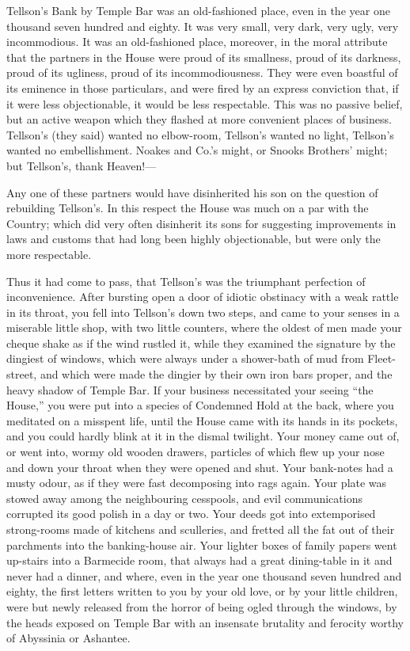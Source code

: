Tellson's Bank by Temple Bar was an old-fashioned place, even in the
year one thousand seven hundred and eighty.  It was very small, very
dark, very ugly, very incommodious.  It was an old-fashioned place,
moreover, in the moral attribute that the partners in the House were
proud of its smallness, proud of its darkness, proud of its ugliness,
proud of its incommodiousness.  They were even boastful of its
eminence in those particulars, and were fired by an express conviction
that, if it were less objectionable, it would be less respectable.
This was no passive belief, but an active weapon which they flashed
at more convenient places of business.  Tellson's (they said) wanted
no elbow-room, Tellson's wanted no light, Tellson's wanted no
embellishment.  Noakes and Co.'s might, or Snooks Brothers' might;
but Tellson's, thank Heaven!---%

Any one of these partners would have disinherited his son on the
question of rebuilding Tellson's.  In this respect the House was much
on a par with the Country; which did very often disinherit its sons
for suggesting improvements in laws and customs that had long been
highly objectionable, but were only the more respectable.

Thus it had come to pass, that Tellson's was the triumphant
perfection of inconvenience.  After bursting open a door of idiotic
obstinacy with a weak rattle in its throat, you fell into Tellson's
down two steps, and came to your senses in a miserable little shop,
with two little counters, where the oldest of men made your cheque
shake as if the wind rustled it, while they examined the signature by
the dingiest of windows, which were always under a shower-bath of mud
from Fleet-street, and which were made the dingier by their own iron
bars proper, and the heavy shadow of Temple Bar.  If your business
necessitated your seeing ``the House,'' you were put into a species of
Condemned Hold at the back, where you meditated on a misspent life,
until the House came with its hands in its pockets, and you could
hardly blink at it in the dismal twilight.  Your money came out of,
or went into, wormy old wooden drawers, particles of which flew up
your nose and down your throat when they were opened and shut.  Your
bank-notes had a musty odour, as if they were fast decomposing into
rags again.  Your plate was stowed away among the neighbouring
cesspools, and evil communications corrupted its good polish in a day
or two.  Your deeds got into extemporised strong-rooms made of
kitchens and sculleries, and fretted all the fat out of their
parchments into the banking-house air.  Your lighter boxes of family
papers went up-stairs into a Barmecide room, that always had a great
dining-table in it and never had a dinner, and where, even in the
year one thousand seven hundred and eighty, the first letters written
to you by your old love, or by your little children, were but newly
released from the horror of being ogled through the windows, by the
heads exposed on Temple Bar with an insensate brutality and ferocity
worthy of Abyssinia or Ashantee.

